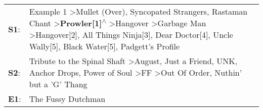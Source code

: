 \begin{supertabular}{p{0.03\textwidth}p{0.92\textwidth}}
 \textbf{S1}:  &  Example 1\textsuperscript{} \textgreater \enspace Mullet (Over)\textsuperscript{}, \enspace Syncopated Strangers\textsuperscript{}, \enspace Rastaman Chant\textsuperscript{} \textgreater \enspace \textbf{Prowler[1]\textsuperscript{$\wedge$}} \textgreater \enspace Hangover\textsuperscript{} \textgreater \enspace Garbage Man\textsuperscript{} \textgreater \enspace Hangover[2]\textsuperscript{}, \enspace All Things Ninja[3]\textsuperscript{}, \enspace Dear Doctor[4]\textsuperscript{}, \enspace Uncle Wally[5]\textsuperscript{}, \enspace Black Water[5]\textsuperscript{}, \enspace Padgett's Profile\textsuperscript{}  \enspace  \\
 \textbf{S2}:  &                                                                                                                                                                                                                              Tribute to the Spinal Shaft\textsuperscript{} \textgreater \enspace August\textsuperscript{}, \enspace Just a Friend\textsuperscript{}, \enspace UNK\textsuperscript{}, \enspace Anchor Drops\textsuperscript{}, \enspace Power of Soul\textsuperscript{} \textgreater \enspace FF\textsuperscript{} \textgreater \enspace Out Of Order\textsuperscript{}, \enspace Nuthin' but a 'G' Thang\textsuperscript{}  \enspace  \\
 \textbf{E1}:  &                                                                                                                                                                                                                                                                                                                                                                                                                                                                                                                                                                                                       The Fussy Dutchman\textsuperscript{}  \enspace  \\
\end{supertabular}
